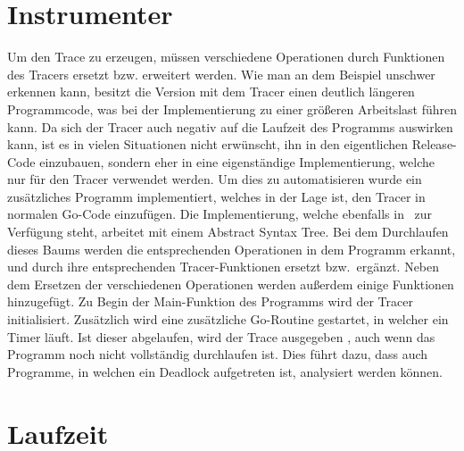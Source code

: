 \section{Instrumenter}\label{Chap:Tracer-Sec:Instrumenter}
Um den Trace zu erzeugen, müssen verschiedene Operationen durch Funktionen
des Tracers ersetzt bzw. erweitert werden. Wie man an dem Beispiel 
unschwer erkennen kann, besitzt die Version mit dem Tracer einen deutlich längeren
Programmcode, was bei der Implementierung zu einer größeren Arbeitslast 
führen kann. Da sich der Tracer auch negativ auf die Laufzeit des Programms 
auswirken kann, ist es in vielen Situationen nicht erwünscht, ihn in den 
eigentlichen Release-Code einzubauen, sondern eher in eine eigenständige 
Implementierung, welche nur für den Tracer verwendet werden. Um dies zu
automatisieren wurde ein zusätzliches Programm implementiert, welches in der 
Lage ist, den Tracer in normalen Go-Code einzufügen. Die Implementierung, 
welche ebenfalls in~\cite{GoChan} zur Verfügung steht, arbeitet mit einem 
Abstract Syntax Tree. Bei dem Durchlaufen dieses Baums werden die 
entsprechenden Operationen in dem Programm erkannt, und durch ihre entsprechenden 
Tracer-Funktionen ersetzt bzw.\ ergänzt. Neben dem Ersetzen der verschiedenen 
Operationen werden außerdem einige Funktionen hinzugefügt. Zu Begin der 
Main-Funktion des Programms wird der Tracer initialisiert. Zusätzlich
wird eine zusätzliche Go-Routine gestartet, in welcher ein Timer läuft. 
Ist dieser abgelaufen, wird der Trace ausgegeben , 
auch wenn das Programm noch nicht vollständig durchlaufen ist. Dies führt dazu,
dass auch Programme, in welchen ein Deadlock aufgetreten ist, analysiert 
werden können. 

\section{Laufzeit}\label{Chap:Tracer-Sec:Laufzeit}
